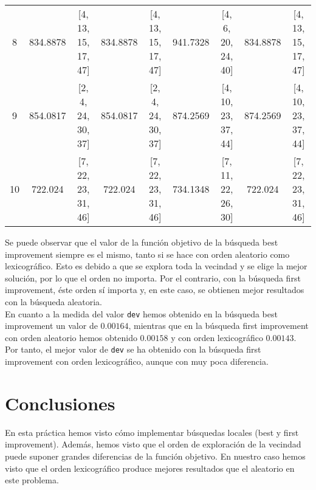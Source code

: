 \documentclass[12pt,a4paper,twoside,openright,titlepage,final]{article}
\begin{document}
\begin{table}[htbp!]
{\begin{tabular}{@{}ccccccccc@{}}
		8                          & 834.8878         & {[}4, 13, 15, 17, 47{]}  & 834.8878         & {[}4, 13, 15, 17, 47{]}  & 941.7328         & {[}4, 6, 20, 24, 40{]}   & 834.8878         & {[}4, 13, 15, 17, 47{]}  \\
		9                          & 854.0817         & {[}2, 4, 24, 30, 37{]}   & 854.0817         & {[}2, 4, 24, 30, 37{]}   & 874.2569         & {[}4, 10, 23, 37, 44{]}  & 874.2569         & {[}4, 10, 23, 37, 44{]}  \\
		10                         & 722.024          & {[}7, 22, 23, 31, 46{]}  & 722.024          & {[}7, 22, 23, 31, 46{]}  & 734.1348         & {[}7, 11, 22, 26, 30{]}  & 722.024          & {[}7, 22, 23, 31, 46{]}  \\ \bottomrule
	\end{tabular}%
}
\end{table}

Se puede observar que el valor de la función objetivo de la búsqueda best improvement siempre es el mismo, tanto si se hace con orden aleatorio como lexicográfico. Esto es debido a que se explora toda la vecindad y se elige la mejor solución, por lo que el orden no importa. Por el contrario, con la búsqueda first improvement, éste orden sí importa y, en este caso, se obtienen mejor resultados con
la búsqueda aleatoria.\\

En cuanto a la medida del valor \texttt{dev} hemos obtenido en la búsqueda best improvement un valor de $0.00164$, mientras que en la búsqueda first improvement con orden aleatorio hemos obtenido $0.00158$ y con orden lexicográfico $0.00143$.\\

Por tanto, el mejor valor de \texttt{dev} se ha obtenido con la búsqueda first improvement con orden lexicográfico, aunque con muy poca diferencia.
\section{Conclusiones}

En esta práctica hemos visto cómo implementar búsquedas locales (best y first improvement). Además, hemos visto que el orden de exploración de la vecindad puede suponer grandes diferencias de la función objetivo. En nuestro caso hemos visto que el orden lexicográfico produce mejores resultados que el aleatorio en este problema.  
\end{document}
